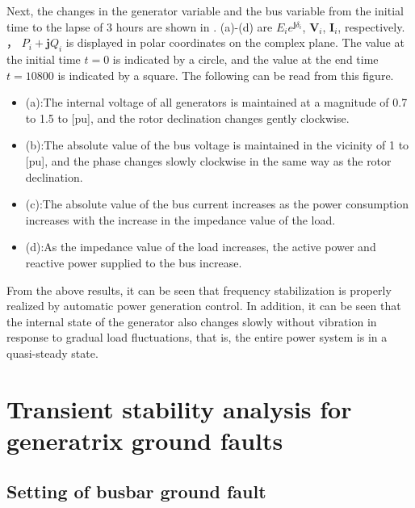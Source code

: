 \documentclass[tombow,dvipdfmx]{corona-a5-1.1}
\begin{document}
Next, the changes in the generator variable and the bus variable from the initial time to the lapse of 3 hours are shown in .
(a)-(d) are $ E_i e^{\bm{j}\delta_i} $, $ \bm{V}_i $, $ \bm{I}_i $, respectively. ， $ P_i + \bm{j} Q_i $ is displayed in polar coordinates on the complex plane.
The value at the initial time $ t = 0 $ is indicated by a circle, and the value at the end time $ t = 10800 $ is indicated by a square.
The following can be read from this figure.

\begin{itemize}
\item {}(a):The internal voltage of all generators is maintained at a magnitude of 0.7 to 1.5 to [pu], and the rotor declination changes gently clockwise.
\item {}(b):The absolute value of the bus voltage is maintained in the vicinity of 1 to [pu], and the phase changes slowly clockwise in the same way as the rotor declination.
\item {}(c):The absolute value of the bus current increases as the power consumption increases with the increase in the impedance value of the load.
\item {}(d):As the impedance value of the load increases, the active power and reactive power supplied to the bus increase.
\end{itemize}

From the above results, it can be seen that frequency stabilization is properly realized by automatic power generation control.
In addition, it can be seen that the internal state of the generator also changes slowly without vibration in response to gradual load fluctuations, that is, the entire power system is in a quasi-steady state.


\section{Transient stability analysis for generatrix ground faults}\label{sec:IEEE68PSS}

\subsection{Setting of busbar ground fault}
\end{document}
